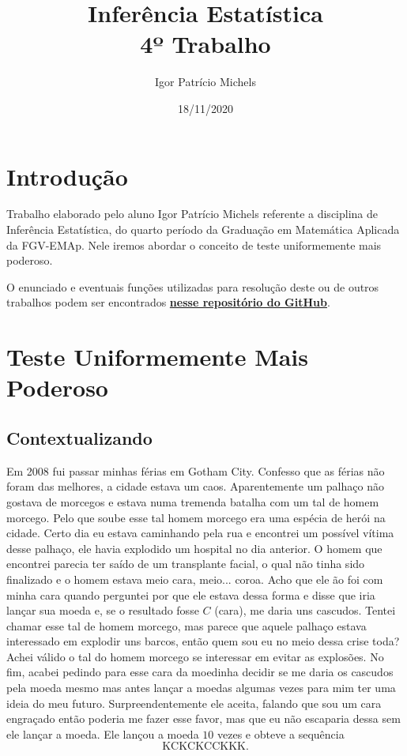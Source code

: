 \documentclass{article}
\title{Inferência Estatística \\ 4º Trabalho}
\author{Igor Patrício Michels}
\date{18/11/2020}
\begin{document}
\maketitle

\section*{Introdução}

Trabalho elaborado pelo aluno Igor Patrício Michels referente a disciplina de Inferência Estatística, do quarto período da Graduação em Matemática Aplicada da FGV-EMAp. Nele iremos abordar o conceito de teste uniformemente mais poderoso.

O enunciado e eventuais funções utilizadas para resolução deste ou de outros trabalhos podem ser encontrados \href{https://github.com/IgorMichels/Statistical_Inference}{\textbf{nesse repositório do GitHub}}.

\section*{Teste Uniformemente Mais Poderoso}

\subsection*{Contextualizando}\label{contexto}

Em 2008 fui passar minhas férias em Gotham City. Confesso que as férias não foram das melhores, a cidade estava um caos. Aparentemente um palhaço não gostava de morcegos e estava numa tremenda batalha com um tal de homem morcego. Pelo que soube esse tal homem morcego era uma espécia de herói na cidade. Certo dia eu estava caminhando pela rua e encontrei um possível vítima desse palhaço, ele havia explodido um hospital no dia anterior. O homem que encontrei parecia ter saído de um transplante facial, o qual não tinha sido finalizado e o homem estava meio cara, meio... coroa. Acho que ele ão foi com minha cara quando perguntei por que ele estava dessa forma e disse que iria lançar sua moeda e, se o resultado fosse $C$ (cara), me daria uns cascudos. Tentei chamar esse tal de homem morcego, mas parece que aquele palhaço estava interessado em explodir uns barcos, então quem sou eu no meio dessa crise toda? Achei válido o tal do homem morcego se interessar em evitar as explosões. No fim, acabei pedindo para esse cara da moedinha decidir se me daria os cascudos pela moeda mesmo mas antes lançar a moedas algumas vezes para mim ter uma ideia do meu futuro. Surpreendentemente ele aceita, falando que sou um cara engraçado então poderia me fazer esse favor, mas que eu não escaparia dessa sem ele lançar a moeda. Ele lançou a moeda $10$ vezes e obteve a sequência
\[\text{KCKCKCCKKK}.\]
\end{document}
